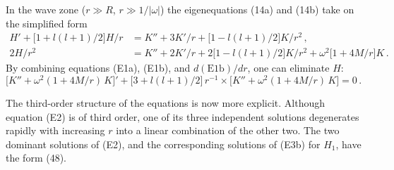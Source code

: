 \documentclass[12pt]{article}
\begin{document}
In the wave zone ($r \gg R$, $r \gg 1/|\omega|$) the eigenequations (14a) and (14b) take on the
simplified form
%
\begin{align}
H' + \bigl[1 + l(l+1)/2\bigr] H/r
  &= K'' + 3K'/r + \bigl[1 - l(l+1)/2\bigr] K/r^2 \,,
\tag{E1a}\\[4pt]
2H/r^2
  &= K'' + 2K'/r + 2\bigl[1 - l(l+1)/2\bigr] K/r^2 + \omega^2\bigl[1 + 4M/r\bigr] K \,.
\tag{E1b}
\end{align}
%
By combining equations (E1a), (E1b), and $d(\text{E1b})/dr$, one can eliminate $H$:
%
\begin{equation}
\bigl[K'' + \omega^2(1 + 4M/r)\,K\bigr]'
+ \bigl[3 + l(l+1)/2\bigr]\,r^{-1}
\times \bigl[K'' + \omega^2(1 + 4M/r)\,K\bigr] = 0 \,.
\tag{E2}
\end{equation}

The third-order structure of the equations is now more explicit. Although equation (E2) is of
third order, one of its three independent solutions degenerates rapidly with increasing $r$ into a
linear combination of the other two. The two dominant solutions of (E2), and the corresponding
solutions of (E3b) for $H_1$, have the form (48).


\end{document}
